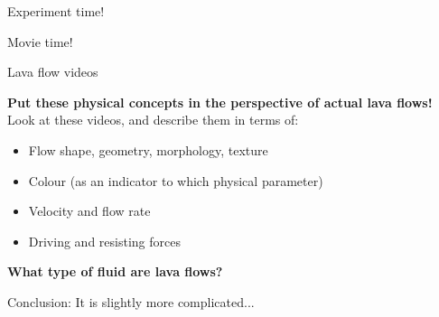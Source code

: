 \documentclass[10pt,aspectratio=169]{beamer}
\begin{document}
\begin{frame}[standout]
  Experiment time!
\end{frame}
 
\begin{frame}[standout]
  Movie time!
\end{frame}

\begin{frame}{Lava flow videos}
  
  \textbf{Put these physical concepts in the perspective of actual lava flows!}\\
  Look at these videos, and describe them in terms of:

  \begin{itemize}
    \item Flow \alert{shape}, \alert{geometry}, \alert{morphology}, \alert{texture}
    \item \alert{Colour} (as an indicator to which physical parameter)
    \item \alert{Velocity} and flow rate
    \item \alert{Driving} and \alert{resisting} forces
  \end{itemize} 
  
  \vspace*{2em}
  \textbf{What type of fluid are \alert{lava flows}?}
\end{frame}


\begin{frame}[standout]
  \alert{Conclusion:} It is slightly more complicated...
\end{frame}
\end{document}
